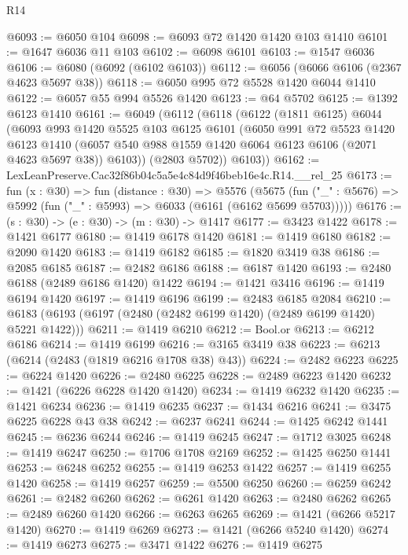 \begin{lexlean}{R14}
\begin{coremodule}
@6093 := @6050 @104
@6098 := @6093 @72 @1420 @1420 @103 @1410
@6101 := @1647 @6036 @11 @103
@6102 := @6098 @6101
@6103 := @1547 @6036
@6106 := @6080 (@6092 (@6102 @6103))
@6112 := @6056 (@6066 @6106 (@2367 @4623 @5697 @38))
@6118 := @6050 @995 @72 @5528 @1420 @6044 @1410
@6122 := @6057 @55 @994 @5526 @1420
@6123 := @64 @5702
@6125 := @1392 @6123 @1410
@6161 := @6049
    (@6112
      (@6118
        (@6122
          (@1811 @6125)
          @6044
          (@6093
            @993
            @1420
            @5525
            @103
            @6125
            @6101
            (@6050
              @991
              @72
              @5523
              @1420
              @6123
              @1410
              (@6057 @540 @988 @1559 @1420 @6064 @6123 @6106 (@2071 @4623 @5697 @38))
              @6103))
          (@2803 @5702))
        @6103))
@6162 := LexLeanPreserve.Cac32f86b04c5a5e4c84d9f46beb16e4c.R14.__rel_25
@6173 := fun (x : @30) =>
  fun (distance : @30) =>
  @5576
    (@5675 (fun ("_" : @5676) => @5992 (fun ("_" : @5993) => @6033 (@6161 (@6162 @5699 @5703)))))
@6176 := (s : @30) -> (e : @30) -> (m : @30) -> @1417
@6177 := @3423 @1422
@6178 := @1421 @6177
@6180 := @1419 @6178 @1420
@6181 := @1419 @6180
@6182 := @2090 @1420
@6183 := @1419 @6182
@6185 := @1820 @3419 @38
@6186 := @2085 @6185
@6187 := @2482 @6186
@6188 := @6187 @1420
@6193 := @2480 @6188 (@2489 @6186 @1420) @1422
@6194 := @1421 @3416
@6196 := @1419 @6194 @1420
@6197 := @1419 @6196
@6199 := @2483 @6185 @2084
@6210 := @6183 (@6193 (@6197 (@2480 (@2482 @6199 @1420) (@2489 @6199 @1420) @5221 @1422)))
@6211 := @1419 @6210
@6212 := Bool.or
@6213 := @6212 @6186
@6214 := @1419 @6199
@6216 := @3165 @3419 @38
@6223 := @6213 (@6214 (@2483 (@1819 @6216 @1708 @38) @43))
@6224 := @2482 @6223
@6225 := @6224 @1420
@6226 := @2480 @6225
@6228 := @2489 @6223 @1420
@6232 := @1421 (@6226 @6228 @1420 @1420)
@6234 := @1419 @6232 @1420
@6235 := @1421 @6234
@6236 := @1419 @6235
@6237 := @1434 @6216
@6241 := @3475 @6225 @6228 @43 @38
@6242 := @6237 @6241
@6244 := @1425 @6242 @1441
@6245 := @6236 @6244
@6246 := @1419 @6245
@6247 := @1712 @3025
@6248 := @1419 @6247
@6250 := @1706 @1708 @2169
@6252 := @1425 @6250 @1441
@6253 := @6248 @6252
@6255 := @1419 @6253 @1422
@6257 := @1419 @6255 @1420
@6258 := @1419 @6257
@6259 := @5500 @6250
@6260 := @6259 @6242
@6261 := @2482 @6260
@6262 := @6261 @1420
@6263 := @2480 @6262
@6265 := @2489 @6260 @1420
@6266 := @6263 @6265
@6269 := @1421 (@6266 @5217 @1420)
@6270 := @1419 @6269
@6273 := @1421 (@6266 @5240 @1420)
@6274 := @1419 @6273
@6275 := @3471 @1422
@6276 := @1419 @6275

\end{coremodule}
\end{lexlean}
